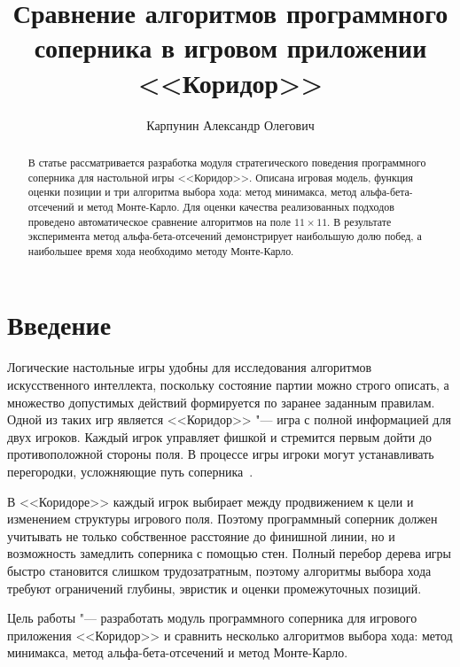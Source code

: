\documentclass{csmathnotes}
\title{Сравнение алгоритмов программного соперника в игровом приложении <<Коридор>>}
\author{Карпунин Александр Олегович}
\affiliation{Ярославский государственный университет им. П.Г. Демидова}
\affiliation{Ярославский государственный университет им. П.Г. Демидова}
\begin{document}
\SetAlFnt{\scriptsize}
\SetAlCapFnt{\scriptsize}
\SetAlCapNameFnt{\scriptsize}

\maketitle

\begin{abstract}
В статье рассматривается разработка модуля стратегического поведения программного соперника для настольной игры <<Коридор>>. Описана игровая модель, функция оценки позиции и три алгоритма выбора хода: метод минимакса, метод альфа-бета-отсечений и метод Монте-Карло. Для оценки качества реализованных подходов проведено автоматическое сравнение алгоритмов на поле $11 \times 11$. В результате эксперимента метод альфа-бета-отсечений демонстрирует наибольшую долю побед, а наибольшее время хода необходимо методу Монте-Карло.

\end{abstract}

\section*{Введение}

Логические настольные игры удобны для исследования алгоритмов искусственного интеллекта, поскольку состояние партии можно строго описать, а множество допустимых действий формируется по заранее заданным правилам. Одной из таких игр является <<Коридор>> "--- игра с полной информацией для двух игроков. Каждый игрок управляет фишкой и стремится первым дойти до противоположной стороны поля. В процессе игры игроки могут устанавливать перегородки, усложняющие путь соперника~\cite{QuoridorRules}.

В <<Коридоре>> каждый игрок выбирает между продвижением к цели и изменением структуры игрового поля. Поэтому программный соперник должен учитывать не только собственное расстояние до финишной линии, но и возможность замедлить соперника с помощью стен. Полный перебор дерева игры быстро становится слишком трудозатратным, поэтому алгоритмы выбора хода требуют ограничений глубины, эвристик и оценки промежуточных позиций.

Цель работы "--- разработать модуль программного соперника для игрового приложения <<Коридор>> и сравнить несколько алгоритмов выбора хода: метод минимакса, метод альфа-бета-отсечений и метод Монте-Карло.
\end{document}
